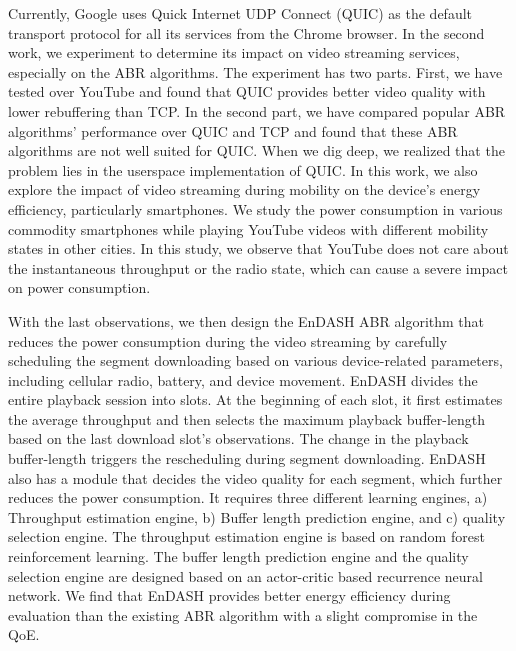 {Currently, Google uses Quick Internet UDP Connect (QUIC) as the default transport protocol for all its services from the Chrome browser. In the second work, we experiment to determine its impact on video streaming services, especially on the ABR algorithms. The experiment has two parts. First, we have tested over YouTube and found that QUIC provides better video quality with lower rebuffering than TCP. In the second part, we have compared popular ABR algorithms' performance over QUIC and TCP and found that these ABR algorithms are not well suited for QUIC. When we dig deep, we realized that the problem lies in the userspace implementation of QUIC. In this work, we also explore the impact of video streaming during mobility on the device's energy efficiency, particularly smartphones. We study the power consumption in various commodity smartphones while playing YouTube videos with different mobility states in other cities. In this study, we observe that YouTube does not care about the instantaneous throughput or the radio state, which can cause a severe impact on power consumption.

With the last observations, we then design the EnDASH ABR algorithm that reduces the power consumption during the video streaming by carefully scheduling the segment downloading based on various device-related parameters, including cellular radio, battery, and device movement. EnDASH divides the entire playback session into slots. At the beginning of each slot, it first estimates the average throughput and then selects the maximum playback buffer-length based on the last download slot's observations. The change in the playback buffer-length triggers the rescheduling during segment downloading. EnDASH also has a module that decides the video quality for each segment, which further reduces the power consumption. It requires three different learning engines, a) Throughput estimation engine, b) Buffer length prediction engine, and c) quality selection engine. The throughput estimation engine is based on random forest reinforcement learning. The buffer length prediction engine and the quality selection engine are designed based on an actor-critic based recurrence neural network. We find that EnDASH provides better energy efficiency during evaluation than the existing ABR algorithm with a slight compromise in the QoE.

}

